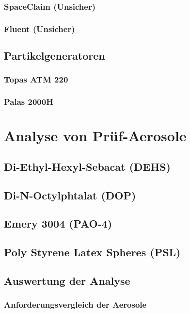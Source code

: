 \subsection{SpaceClaim (Unsicher)}
\subsection{Fluent (Unsicher)}

\section{Partikelgeneratoren}
\subsection{Topas ATM 220}
\subsection{Palas 2000H}


\chapter{Analyse von Pr\"{u}f-Aerosole}\label{ch:work}
\section{Di-Ethyl-Hexyl-Sebacat (DEHS)}
\section{Di-N-Octylphtalat (DOP)}
\section{Emery 3004 (PAO-4)}
\section{Poly Styrene Latex Spheres (PSL)}
\section{Auswertung der Analyse}
\subsection{Anforderungsvergleich der Aerosole}


